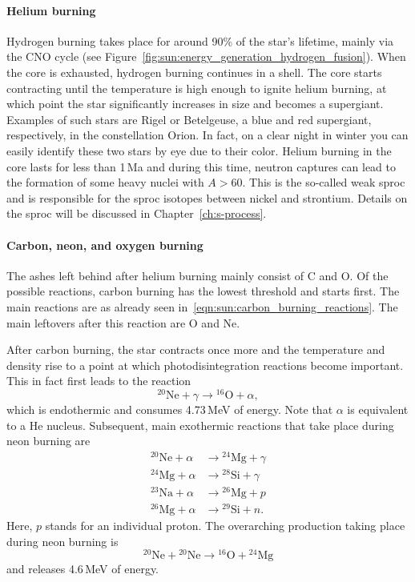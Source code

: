 \paragraph{Helium burning}
Hydrogen burning takes place for around 90\% of the star's lifetime, mainly via the CNO cycle (see Figure~\ref{fig:sun:energy_generation_hydrogen_fusion}). When the core is exhausted, hydrogen burning continues in a shell. The core starts contracting until the temperature is high enough to ignite helium burning, at which point the star significantly increases in size and becomes a supergiant. Examples of such stars are Rigel or Betelgeuse, a blue and red supergiant, respectively, in the constellation Orion. In fact, on a clear night in winter you can easily identify these two stars by eye due to their color. Helium burning in the core lasts for less than 1\,Ma and during this time, neutron captures can lead to the formation of some heavy nuclei with $A>60$. This is the so-called weak \ac{sproc} and is responsible for the \ac{sproc} isotopes between nickel and strontium. Details on the \ac{sproc} will be discussed in Chapter~\ref{ch:s-process}. 

\paragraph{Carbon, neon, and oxygen burning}
The ashes left behind after helium burning mainly consist of C and O. Of the possible reactions, carbon burning has the lowest threshold and starts first. The main reactions are as already seen in~\eqref{eqn:sun:carbon_burning_reactions}.
The main leftovers after this reaction are O and Ne.

After carbon burning, the star contracts once more and the temperature and density rise to a point at which photodisintegration reactions become important. This in fact first leads to the reaction
\begin{equation}
    {^{20}}\mathrm{Ne} + \gamma \longrightarrow {^{16}}\mathrm{O} + \alpha,
\end{equation}
which is endothermic and consumes 4.73\,MeV of energy. Note that $\alpha$ is equivalent to a He nucleus. Subsequent, main exothermic reactions that take place during neon burning are
\begin{align}
    {^{20}}\mathrm{Ne} + \alpha &\longrightarrow {^{24}}\mathrm{Mg} + \gamma \\
    {^{24}}\mathrm{Mg} + \alpha &\longrightarrow {^{28}}\mathrm{Si} + \gamma \\
    {^{23}}\mathrm{Na} + \alpha &\longrightarrow {^{26}}\mathrm{Mg} + p \\
    {^{26}}\mathrm{Mg} + \alpha &\longrightarrow {^{29}}\mathrm{Si} + n.
\end{align}
Here, $p$ stands for an individual proton. The overarching production taking place during neon burning is
\begin{equation}
    {^{20}}\mathrm{Ne} + {^{20}}\mathrm{Ne} \longrightarrow {^{16}}\mathrm{O} + {^{24}}\mathrm{Mg}
\end{equation}
and releases 4.6\,MeV of energy.


